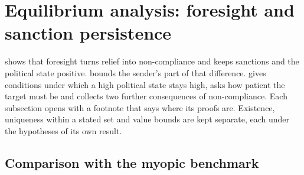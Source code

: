 \section{Equilibrium analysis: foresight and sanction persistence}
\label{sec:results}
\label{sec:existence}

  shows that foresight turns relief into
non-compliance and keeps sanctions and the political state positive.
 bounds the sender's part of that difference.  gives conditions under which a high
political state stays high,  asks how patient the
target must be and collects two further consequences
of non-compliance. Each subsection opens with a footnote that says where its proofs are.
Existence, uniqueness within a stated set and value bounds are kept separate, each
under the hypotheses of its own result.

\subsection{Comparison with the myopic benchmark}
\label{sec:existence:placable}
\label{sec:results:main}

